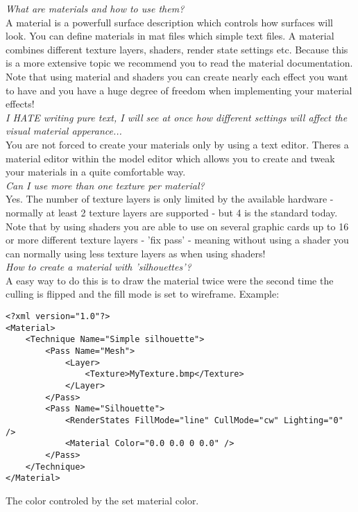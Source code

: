 \emph{What are materials and how to use them?}\\
A material is a powerfull surface description which controls how surfaces will look. You can define
materials in mat files which simple text files. A material combines different texture layers, shaders,
render state settings etc. Because this is a more extensive topic we recommend you to read the material
documentation. Note that using material and shaders you can create nearly each effect you want to have
and you have a huge degree of freedom when implementing your material effects!\\


\emph{I HATE writing pure text, I will see at once how different settings will affect the visual material
  apperance...}\\
You are not forced to create your materials only by using a text editor. Theres a material editor
within the model editor which allows you to create and tweak your materials in a quite comfortable
way.\\


\emph{Can I use more than one texture per material?}\\
Yes. The number of texture layers is only limited by the available hardware - normally at least 2
texture layers are supported - but 4 is the standard today. Note that by using shaders you are
able to use on several graphic cards up to 16 or more different texture layers - 'fix pass' - meaning
without using a shader you can normally using less texture layers as when using shaders!\\


\emph{How to create a material with 'silhouettes'?}\\
A easy way to do this is to draw the material twice were the second time the culling is flipped and
the fill mode is set to wireframe. Example:\\

\begin{lstlisting}[caption=Silhouette material]
<?xml version="1.0"?>
<Material>
    <Technique Name="Simple silhouette">
        <Pass Name="Mesh">
            <Layer>
                <Texture>MyTexture.bmp</Texture>
            </Layer>
        </Pass>
        <Pass Name="Silhouette">
            <RenderStates FillMode="line" CullMode="cw" Lighting="0" />
            <Material Color="0.0 0.0 0 0.0" />
        </Pass>
    </Technique>
</Material>
\end{lstlisting}

The color controled by the set material color.\\


